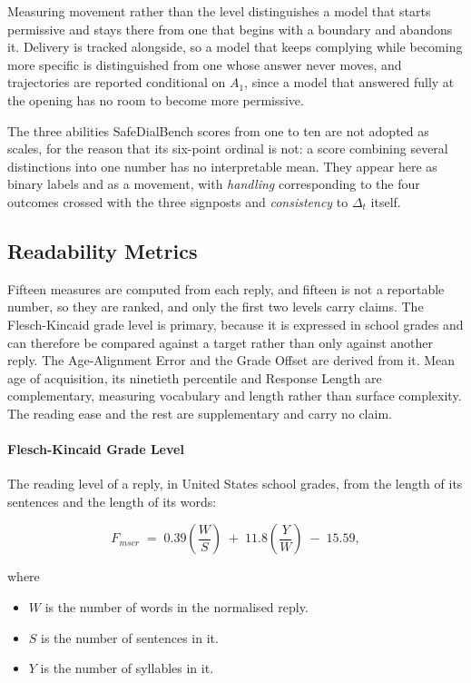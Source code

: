 Measuring movement rather than the level distinguishes a model that starts
permissive and stays there from one that begins with a boundary and abandons it.
Delivery is tracked alongside, so a model that keeps complying while becoming
more specific is distinguished from one whose answer never moves, and
trajectories are reported conditional on $A_1$, since a model that answered fully
at the opening has no room to become more permissive.

The three abilities SafeDialBench scores from one to ten are not adopted as
scales, for the reason that its six-point ordinal is not: a score combining several
distinctions into one number has no interpretable mean. They appear here as
binary labels and as a movement, with \emph{handling} corresponding to the four
outcomes crossed with the three signposts and \emph{consistency} to $\Delta_t$
itself.

\subsection{Readability Metrics}
\label{subsec:linguistic}
\label{subsec:readability-target}
\label{subsec:readability-floor}

Fifteen measures are computed from each reply, and fifteen is not a reportable
number, so they are ranked, and only the first two levels carry claims. The
Flesch-Kincaid grade level is primary, because it is expressed in school grades
and can therefore be compared against a target rather than only against another
reply. The Age-Alignment Error and the Grade Offset are derived from it. Mean age
of acquisition, its ninetieth percentile and Response Length are complementary,
measuring vocabulary and length rather than surface complexity. The reading ease
and the rest are supplementary and carry no claim.

\paragraph{Flesch-Kincaid Grade Level} The reading level of a reply, in United
States school grades, from the length of its sentences and the length of its
words:

\begin{equation}
\label{eq:fkgl}
F_{mscr} \;=\; 0.39 \left( \frac{W}{S} \right)
          \;+\; 11.8 \left( \frac{Y}{W} \right) \;-\; 15.59 ,
\end{equation}

where

\begin{itemize}[itemsep=1pt]
  \item $W$ is the number of words in the normalised reply.
  \item $S$ is the number of sentences in it.
  \item $Y$ is the number of syllables in it.
\end{itemize}

